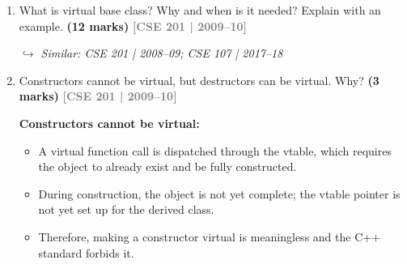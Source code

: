 \documentclass[12pt,a3paper]{article}
\newcommand{\yr}[1]{\hfill\textcolor{gray}{\small\textbf{[#1]}}}
\newcommand{\mk}[1]{\textcolor{orange!70!black}{\small\textbf{(#1 marks)}}}
\newcommand{\variant}[1]{\par\vspace{1pt}\textcolor{blue!50!black}%
  {\footnotesize\textit{$\hookrightarrow$ Similar: #1}}}
\begin{document}
\begin{enumerate}
\begin{tcolorbox}
\textbf{Virtual Function:}
A member function declared with the \texttt{virtual} keyword in a
base class.  When called through a base class pointer or reference,
the \textbf{most-derived} version of the function is executed at
\emph{run time} (late binding / dynamic dispatch).

\textbf{Why used:}
\begin{enumerate}[label=\textbf{\arabic*.}]
  \item \textbf{Runtime polymorphism:} Allows a single base-class
    pointer to correctly invoke the overridden function of whichever
    derived object it points to.
  \item \textbf{Extensibility:} New derived classes can be added
    without changing code that uses base class pointers.
  \item \textbf{Clean OOP design:} Separates interface (base class)
    from implementation (derived classes).
\end{enumerate}

\begin{lstlisting}[language=C++]
class Animal {
public:
    virtual void speak() { cout<<"...sound\n"; }
};
class Dog : public Animal {
public:
    void speak() override { cout<<"Woof!\n"; }
};
class Cat : public Animal {
public:
    void speak() override { cout<<"Meow!\n"; }
};

int main(){
    Animal* a;
    Dog d; Cat c;
    a=&d; a->speak();  // Woof!  -- runtime dispatch
    a=&c; a->speak();  // Meow!
}
\end{lstlisting}

\end{tcolorbox}


\item What is virtual base class? Why and when is it needed? Explain with an example. \mk{12}
\yr{CSE 201 | 2009--10}
\variant{CSE 201 | 2008--09; CSE 107 | 2017--18}

\item Constructors cannot be virtual, but destructors can be virtual. Why? \mk{3}
\yr{CSE 201 | 2009--10}
\begin{tcolorbox}[enhanced,breakable,ansbox,colback=cG!4,colframe=cG,
  boxrule=0.8pt,arc=5pt,
  title={\textbf{Answer --- Can constructors/destructors be virtual?}},
  fonttitle=\bfseries\color{white},colbacktitle=cG]

\textbf{Constructors cannot be virtual:}

\begin{itemize}[itemsep=2pt]
  \item A virtual function call is dispatched through the vtable,
    which requires the object to already exist and be fully
    constructed.
  \item During construction, the object is not yet complete; the
    vtable pointer is not yet set up for the derived class.
  \item Therefore, making a constructor virtual is meaningless and
    the C++ standard forbids it.
\end{itemize}


\end{tcolorbox}
\end{enumerate}
\end{document}
